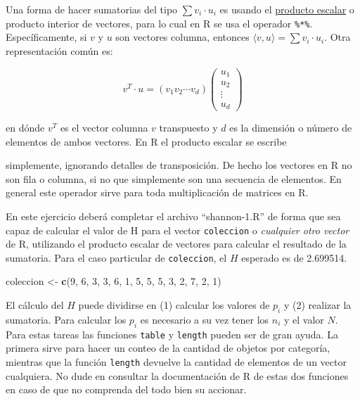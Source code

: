 \documentclass[]{article}
\newenvironment{Shaded}{}{}
\newcommand{\KeywordTok}[1]{\textcolor[rgb]{0.00,0.44,0.13}{\textbf{{#1}}}}
\newcommand{\DecValTok}[1]{\textcolor[rgb]{0.25,0.63,0.44}{{#1}}}
\newcommand{\NormalTok}[1]{{#1}}
\begin{document}
Una forma de hacer sumatorias del tipo $\sum v_i \cdot u_i$ es usando el
\href{https://es.wikipedia.org/wiki/Producto\_escalar}{producto escalar}
o producto interior de vectores, para lo cual en R se usa el operador
\texttt{\%*\%}. Específicamente, si $v$ y $u$ son vectores columna,
entonces $\langle v, u \rangle = \sum v_i \cdot u_i$. Otra
representación común es:

\[
  v^T \cdot u = (v_1 v_2 \cdots v_d)
    \begin{pmatrix}
      u_1 \\
      u_2 \\
      \vdots \\
      u_d
    \end{pmatrix}
\]

en dónde $v^T$ es el vector columna $v$ transpuesto y $d$ es la
dimensión o número de elementos de ambos vectores. En R el producto
escalar se escribe

\begin{Shaded}
\end{Shaded}
simplemente, ignorando detalles de transposición. De hecho los vectores
en R no son fila o columna, si no que simplemente son una secuencia de
elementos. En general este operador sirve para toda multiplicación de
matrices en R.

En este ejercicio deberá completar el archivo ``shannon-1.R'' de forma
que sea capaz de calcular el valor de H para el vector
\texttt{coleccion} o \emph{cualquier otro vector} de R, utilizando el
producto escalar de vectores para calcular el resultado de la sumatoria.
Para el caso particular de \texttt{coleccion}, el $H$ esperado es de
2.699514.

\begin{Shaded}
\begin{Highlighting}[]
\NormalTok{coleccion <- }\KeywordTok{c}\NormalTok{(}\DecValTok{9}\NormalTok{, }\DecValTok{6}\NormalTok{, }\DecValTok{3}\NormalTok{, }\DecValTok{3}\NormalTok{, }\DecValTok{6}\NormalTok{, }\DecValTok{1}\NormalTok{, }\DecValTok{5}\NormalTok{, }\DecValTok{5}\NormalTok{, }\DecValTok{5}\NormalTok{, }\DecValTok{3}\NormalTok{, }\DecValTok{2}\NormalTok{, }\DecValTok{7}\NormalTok{, }\DecValTok{2}\NormalTok{, }\DecValTok{1}\NormalTok{)}
\end{Highlighting}
\end{Shaded}
El cálculo del $H$ puede dividirse en (1) calcular los valores de $p_i$
y (2) realizar la sumatoria. Para calcular los $p_i$ es necesario a su
vez tener los $n_i$ y el valor $N$. Para estas tareas las funciones
\texttt{table} y \texttt{length} pueden ser de gran ayuda. La primera
sirve para hacer un conteo de la cantidad de objetos por categoría,
mientras que la función \texttt{length} devuelve la cantidad de
elementos de un vector cualquiera. No dude en consultar la documentación
de R de estas dos funciones en caso de que no comprenda del todo bien su
accionar.
\end{document}
